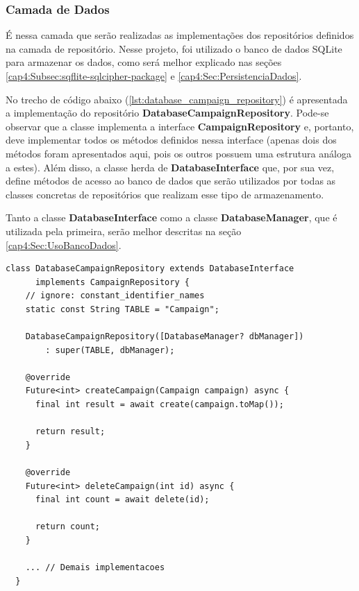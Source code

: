 \subsubsection{Camada de Dados}
\label{cap4:SubSubSec:Dados}

É nessa camada que serão realizadas as implementações dos repositórios definidos na camada de repositório. Nesse projeto, foi utilizado o banco de dados SQLite para armazenar os dados, como será melhor explicado nas seções \ref{cap4:Subsec:sqflite-sqlcipher-package} e \ref{cap4:Sec:PersistenciaDados}.

No trecho de código abaixo (\ref{lst:database_campaign_repository}) é apresentada a implementação do repositório \textbf{DatabaseCampaignRepository}. Pode-se observar que a classe implementa a interface \textbf{CampaignRepository} e, portanto, deve implementar todos os métodos definidos nessa interface (apenas dois dos métodos foram apresentados aqui, pois os outros possuem uma estrutura análoga a estes). Além disso, a classe herda de \textbf{DatabaseInterface} que, por sua vez, define métodos de acesso ao banco de dados que serão utilizados por todas as classes concretas de repositórios que realizam esse tipo de armazenamento.

Tanto a classe \textbf{DatabaseInterface} como a classe \textbf{DatabaseManager}, que é utilizada pela primeira, serão melhor descritas na seção \ref{cap4:Sec:UsoBancoDados}.

\begin{lstlisting}[caption={Implementação na classe \textbf{DatabaseCampaignRepository} da interface \textbf{CampaignRepository}}, label={lst:database_campaign_repository}]
  class DatabaseCampaignRepository extends DatabaseInterface
      implements CampaignRepository {
    // ignore: constant_identifier_names
    static const String TABLE = "Campaign";

    DatabaseCampaignRepository([DatabaseManager? dbManager])
        : super(TABLE, dbManager);

    @override
    Future<int> createCampaign(Campaign campaign) async {
      final int result = await create(campaign.toMap());

      return result;
    }

    @override
    Future<int> deleteCampaign(int id) async {
      final int count = await delete(id);

      return count;
    }

    ... // Demais implementacoes
  }
\end{lstlisting}

